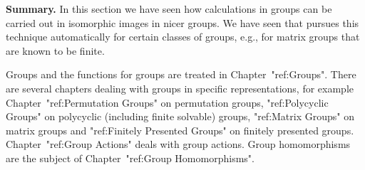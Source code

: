 {\bf Summary.}  In this section we have  seen  how calculations in groups
can be carried  out in isomorphic  images in  nicer groups. We  have seen
that {\GAP}  pursues this technique  automatically for certain classes of
groups, e.g., for matrix groups that are known to be finite.


Groups and the functions for groups are treated in Chapter~"ref:Groups".
There are several chapters dealing with groups in specific representations,
for example Chapter~"ref:Permutation Groups" on permutation groups,
"ref:Polycyclic Groups" on polycyclic (including finite solvable) groups,
"ref:Matrix Groups" on matrix groups and "ref:Finitely Presented Groups" on
finitely presented groups.
Chapter~"ref:Group Actions" deals with group actions. Group
homomorphisms are the subject of Chapter~"ref:Group Homomorphisms".


